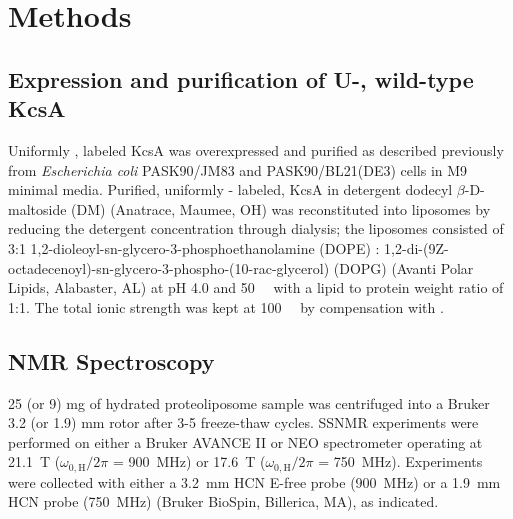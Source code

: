\documentclass[%
 aip,
 amsmath,amssymb,
 preprint,%
]{revtex4-1}
\begin{document}
\section{Methods}

\subsection{Expression and purification of U-, wild-type KcsA}
Uniformly , labeled KcsA was overexpressed and purified as described previously from \textit{Escherichia coli} PASK90/JM83 and PASK90/BL21(DE3) cells in M9 minimal media.\cite{Bhate2013,Xu2017,Zhang2020a} Purified, uniformly - labeled, KcsA in detergent dodecyl $\beta$-D-maltoside (DM) (Anatrace, Maumee, OH) was reconstituted into liposomes by reducing the detergent concentration through dialysis; the liposomes consisted of 3:1 1,2-dioleoyl-sn-glycero-3-phosphoethanolamine (DOPE) : 1,2-di-(9Z-octadecenoyl)-sn-glycero-3-phospho-(10-rac-glycerol) (DOPG) (Avanti Polar Lipids, Alabaster, AL) at pH 4.0 and \SI{50}{\milli\molar}  with a lipid to protein weight ratio of 1:1. The total ionic strength was kept at \SI{100}{\milli\molar} by compensation with .

\subsection{NMR Spectroscopy}
25 (or 9) \si{\milli\gram} of hydrated proteoliposome sample was centrifuged into a Bruker 3.2 (or 1.9) \si{\milli\meter} rotor after 3-5 freeze-thaw cycles. SSNMR experiments were performed on either a Bruker AVANCE II or NEO spectrometer operating at \SI{21.1}{\tesla} ($\omega_{0,\text{H}}/2\pi$ = \SI{900}{\mega\hertz}) or \SI{17.6}{\tesla} ($\omega_{0,\text{H}}/2\pi$ = \SI{750}{\mega\hertz}). Experiments were collected with either a \SI{3.2}{\milli\meter} HCN E-free probe (\SI{900}{\mega\hertz}) or a \SI{1.9}{\milli\meter} HCN probe (\SI{750}{\mega\hertz}) (Bruker BioSpin, Billerica, MA), as indicated. 
\end{document}

